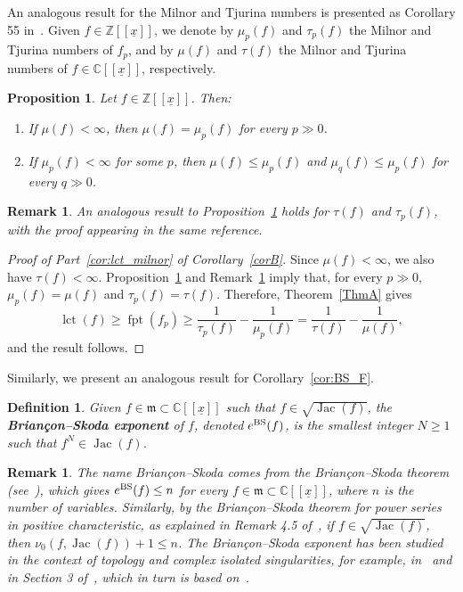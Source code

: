 \documentclass{article}
\newtheorem{definition}[theorem]{Definition}
\newtheorem{proposition}[theorem]{Proposition}
\newtheorem{remark}[theorem]{Remark}
\DeclareMathOperator{\Jac}{Jac}
\DeclareMathOperator{\fpt}{fpt}
\DeclareMathOperator{\lct}{lct}
\numberwithin{theorem}{section}
\begin{document}
An analogous result for the Milnor and Tjurina numbers is presented as Corollary 55 in~\cite{greuel2021semicontinuity}. Given $f\in\mathbb{Z}[[\underline{x}]]$, we denote by $\mu_p(f)$ and $\tau_p(f)$ the Milnor and Tjurina numbers of $f_p$, and by $\mu(f)$ and $\tau(f)$ the Milnor and Tjurina numbers of $f\in\mathbb{C}[[\underline{x}]]$, respectively.

\begin{proposition}\label{prop:tau_p}
Let $f\in\mathbb{Z}[[\underline{x}]]$. Then:
\begin{enumerate}
    \item If $\mu(f)<\infty$, then $\mu(f)=\mu_p(f)$ for every $p\gg0$.
    \item If $\mu_p(f)<\infty$ for some $p$, then $\mu(f)\leq\mu_p(f)$ and $\mu_q(f)\leq\mu_p(f)$ for every $q\gg0$.
\end{enumerate}
\end{proposition}

\begin{remark}\label{rem:tau_p}
\textup{An analogous result to Proposition~\ref{prop:tau_p} holds for $\tau(f)$ and $\tau_p(f)$, with the proof appearing in the same reference.}
\end{remark}

\begin{proof}[Proof of Part~\ref{cor:lct_milnor} of Corollary~\ref{corB}]
Since $\mu(f)<\infty$, we also have $\tau(f)<\infty$. Proposition~\ref{prop:tau_p} and Remark~\ref{rem:tau_p} imply that, for every $p\gg0$, $\mu_p(f)=\mu(f)$ and $\tau_p(f)=\tau(f)$. Therefore, Theorem~\ref{ThmA} gives
\[
    \lct(f)\geq\fpt(f_p)\geq
    \frac{1}{\tau_p(f)}-\frac{1}{\mu_p(f)}
    =\frac{1}{\tau(f)}-\frac{1}{\mu(f)},
\]
and the result follows.
\end{proof}

Similarly, we present an analogous result for Corollary~\ref{cor:BS_F}.

\begin{definition}\label{def:eBS}
Given $f\in\mathfrak{m}\subset\mathbb{C}[[\underline{x}]]$ such that $f\in\sqrt{\Jac(f)}$, the \textbf{Brian{\c{c}}on--Skoda exponent} of $f$, denoted $e^{\textup{BS}}(f)$, is the smallest integer $N\geq1$ such that $f^N\in\Jac(f)$.
\end{definition}

\begin{remark}
\textup{The name Brian{\c{c}}on--Skoda comes from the Brian{\c{c}}on--Skoda theorem (see~\cite{skoda1974cloture}), which gives $e^{\textup{BS}}(f)\leq n$ for every $f\in\mathfrak{m}\subset\mathbb{C}[[\underline{x}]]$, where $n$ is the number of variables. Similarly, by the Brian{\c{c}}on--Skoda theorem for power series in positive characteristic, as explained in Remark 4.5 of~\cite{hefez2019hypersurface}, if $f\in\sqrt{\Jac(f)}$, then $\nu_0(f,\Jac(f))+1\leq n$. The Brian{\c{c}}on--Skoda exponent has been studied in the context of topology and complex isolated singularities, for example, in~\cite{jung2022brianccon} and in Section 3 of~\cite{almiron2023tjurina}, which in turn is based on~\cite{varvcenko1982asymptotic}.}
\end{remark}
\end{document}

